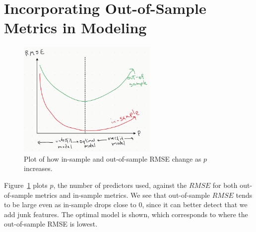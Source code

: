 \documentclass[12pt, a4paper]{article}
\theoremstyle{definition}
\begin{document}
	\section*{Incorporating Out-of-Sample Metrics in Modeling}
	\begin{figure}
		\centering
		\includegraphics[width=0.6\textwidth]{p-vs-RMSE-oos-insample}
		\caption{Plot of how in-sample and out-of-sample RMSE change
		as $p$ increases.}
		\label{fig:oos-insamp-rmse-p}
	\end{figure}
	Figure~\ref{fig:oos-insamp-rmse-p} plots $p$, the number of predictors
	used, against the $RMSE$ for both out-of-sample metrics and in-sample
	metrics. We see that out-of-sample $RMSE$ tends to be large
	even as in-sample drops close to $0$, since it can better
	detect that we add junk features. The optimal model is shown,
	which corresponds to where the out-of-sample RMSE is lowest.
	
\end{document}
